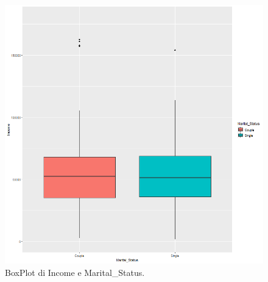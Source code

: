 \documentclass[letterpaper,11pt]{article}
\begin{document}
\begin{figure}[H]
\begin{minipage}[b]{0.4\textwidth}
    \includegraphics[width=\textwidth]{Img/EDA/EDA006.png}
    \caption{BoxPlot di Income e Marital\_Status.}
     \label{fig:BoxPlotMaritalStatus}
  \end{minipage}
\end{figure}
\end{document}
